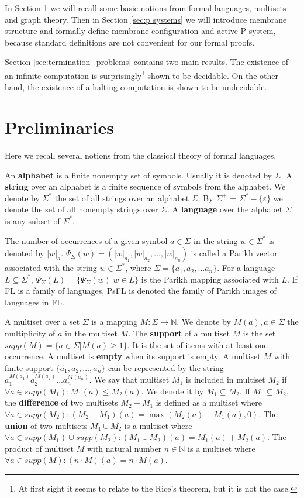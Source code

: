 \documentclass[llncs,submission,copyright,creativecommons]{../lib/lncs/llncs}
\def\eps{\varepsilon}
\begin{document}
In Section \ref{sec:preliminaries} we will recall some basic notions from formal languages, multisets and graph theory. Then in Section \ref{sec:p systems} we will introduce membrane structure and formally define membrane configuration and active P system, because standard definitions are not convenient for our formal proofs.

Section \ref{sec:termination_problems} contains two main results. The existence of an infinite computation is surprisingly\footnote{At first sight it seems to relate to the Rice's theorem, but it is not the case.} shown to be decidable.
On the other hand, the existence of a halting computation is shown to be undecidable.


\section{Preliminaries}
\label{sec:preliminaries}

Here we recall several notions from the classical theory of formal languages.

An {\bf alphabet} is a finite nonempty set of symbols. Usually it is denoted by $\Sigma$. A {\bf string} over an alphabet is a finite sequence of symbols from the alphabet. We denote by $\Sigma^*$ the set of all strings over an alphabet $\Sigma$. By $\Sigma^+$ = $\Sigma^* - \{\eps\}$ we denote the set of all nonempty strings over $\Sigma$. A {\bf language} over the alphabet $\Sigma$ is any subset of $\Sigma^*$.

The number of occurrences of a given symbol $a\in \Sigma$ in the string $w\in \Sigma^*$ is denoted by $|w|_a$. $\Psi_\Sigma(w)=(|w|_{a_1},|w|_{a_2},\dots,|w|_{a_n})$ is called a Parikh vector associated with the string $w\in \Sigma^*$, where $\Sigma=\{a_1,a_2,\dots a_n\}$. For a language $L\subseteq \Sigma^*$, $\Psi_\Sigma(L)=\{\Psi_\Sigma(w)|w\in L\}$ is the Parikh mapping associated with $L$. If FL is a family of languages, PsFL is denoted the family of Parikh images of languages in FL.

A multiset over a set $\Sigma$ is a mapping $M: \Sigma\rightarrow \mathbb N$.
We denote by $M(a), a\in \Sigma$ the multiplicity of $a$ in the multiset $M$.
The {\bf support} of a multiset $M$ is the set $supp(M)=\{a\in \Sigma|M(a)\geq 1\}$.
It is the set of items with at least one occurrence.
A multiset is {\bf empty} when its support is empty.
A multiset $M$ with finite support $\{a_1, a_2, \dots, a_n\}$ can be represented by the string $a_1^{M(a_1)}a_2^{M(a_2)}\dots a_n^{M(a_n)}$.
We say that multiset $M_1$ is included in multiset $M_2$ if $\forall a \in supp(M_1): M_1(a)\leq M_2(a)$.
We denote it by $M_1\subseteq M_2$.
If $M_1\subseteq M_2$, the {\bf difference} of two multisets $M_2-M_1$ is defined as a multiset where $\forall a \in supp(M_2): (M_2-M_1)(a)=\max(M_2(a)-M_1(a),0)$.
The {\bf union} of two multisets $M_1\cup M_2$ is a multiset where $\forall a \in supp(M_1)\cup supp(M_2): (M_1\cup M_2)(a)=M_1(a)+M_2(a)$.
The product of multiset $M$ with natural number $n\in \mathbb N$ is a multiset where $\forall a \in supp(M): (n\cdot M)(a)=n\cdot M(a)$.
\end{document}
